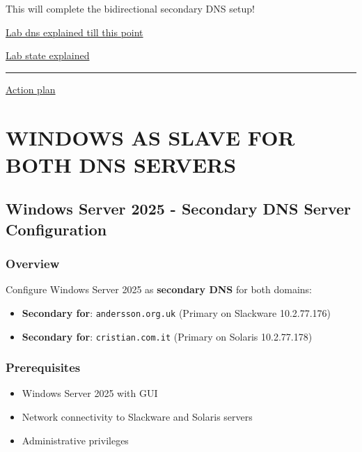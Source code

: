 This will complete the bidirectional secondary DNS setup! 🎯

\href{Third\%20-\%20DNS\%20263f56fc503e80ddb361c216e75fd3bf/Lab\%20dns\%20explained\%20till\%20this\%20point\%20268f56fc503e808ea4b3f3d4d343e0a4.md}{Lab
dns explained till this point}

\href{Third\%20-\%20DNS\%20263f56fc503e80ddb361c216e75fd3bf/Lab\%20state\%20explained\%20268f56fc503e80ceb678fa071f071f39.md}{Lab
state explained}

\begin{center}\rule{0.5\linewidth}{0.5pt}\end{center}

\href{Third\%20-\%20DNS\%20263f56fc503e80ddb361c216e75fd3bf/Action\%20plan\%20268f56fc503e80e9aacffa65654c7332.md}{Action
plan}

\section{WINDOWS AS SLAVE FOR BOTH DNS SERVERS}\label{windows-as-slave-for-both-dns-servers}

\subsection{Windows Server 2025 - Secondary DNS Server Configuration}\label{windows-server-2025---secondary-dns-server-configuration}

\subsubsection{Overview}\label{overview-windows}

Configure Windows Server 2025 as \textbf{secondary DNS} for both domains:

\begin{itemize}
\tightlist
\item
  \textbf{Secondary for}: \texttt{andersson.org.uk} (Primary on Slackware 10.2.77.176)
\item
  \textbf{Secondary for}: \texttt{cristian.com.it} (Primary on Solaris 10.2.77.178)
\end{itemize}

\subsubsection{Prerequisites}\label{prerequisites-windows}

\begin{itemize}
\tightlist
\item
  Windows Server 2025 with GUI
\item
  Network connectivity to Slackware and Solaris servers
\item
  Administrative privileges
\end{itemize}

